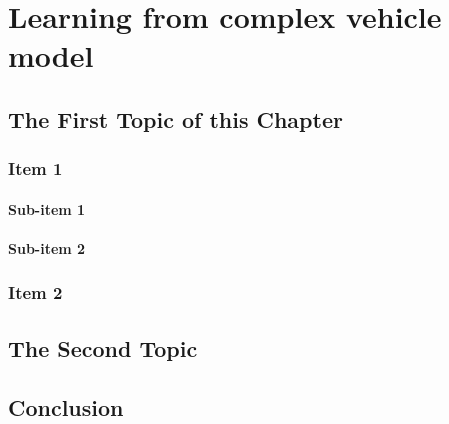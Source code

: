 \chapter{Learning from complex vehicle model}
\label{cha:Tracking_MPC}







\section{The First Topic of this Chapter}
\subsection{Item 1}
\subsubsection{Sub-item 1}


\subsubsection{Sub-item 2}


\subsection{Item 2}


\section{The Second Topic}


\section{Conclusion}

